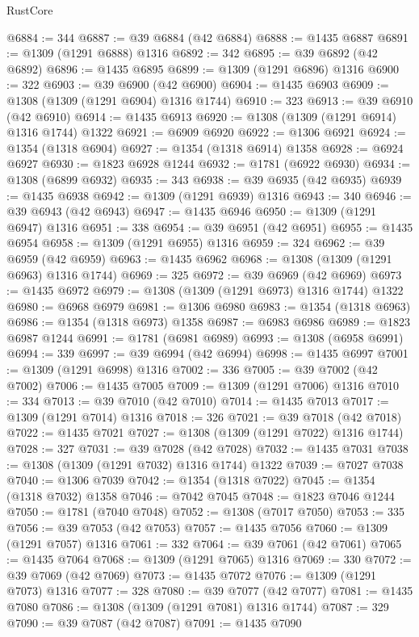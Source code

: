 \begin{lexlean}{RustCore}
\begin{coremodule}
@6884 := 344
@6887 := @39 @6884 (@42 @6884)
@6888 := @1435 @6887
@6891 := @1309 (@1291 @6888) @1316
@6892 := 342
@6895 := @39 @6892 (@42 @6892)
@6896 := @1435 @6895
@6899 := @1309 (@1291 @6896) @1316
@6900 := 322
@6903 := @39 @6900 (@42 @6900)
@6904 := @1435 @6903
@6909 := @1308 (@1309 (@1291 @6904) @1316 @1744)
@6910 := 323
@6913 := @39 @6910 (@42 @6910)
@6914 := @1435 @6913
@6920 := @1308 (@1309 (@1291 @6914) @1316 @1744) @1322
@6921 := @6909 @6920
@6922 := @1306 @6921
@6924 := @1354 (@1318 @6904)
@6927 := @1354 (@1318 @6914) @1358
@6928 := @6924 @6927
@6930 := @1823 @6928 @1244
@6932 := @1781 (@6922 @6930)
@6934 := @1308 (@6899 @6932)
@6935 := 343
@6938 := @39 @6935 (@42 @6935)
@6939 := @1435 @6938
@6942 := @1309 (@1291 @6939) @1316
@6943 := 340
@6946 := @39 @6943 (@42 @6943)
@6947 := @1435 @6946
@6950 := @1309 (@1291 @6947) @1316
@6951 := 338
@6954 := @39 @6951 (@42 @6951)
@6955 := @1435 @6954
@6958 := @1309 (@1291 @6955) @1316
@6959 := 324
@6962 := @39 @6959 (@42 @6959)
@6963 := @1435 @6962
@6968 := @1308 (@1309 (@1291 @6963) @1316 @1744)
@6969 := 325
@6972 := @39 @6969 (@42 @6969)
@6973 := @1435 @6972
@6979 := @1308 (@1309 (@1291 @6973) @1316 @1744) @1322
@6980 := @6968 @6979
@6981 := @1306 @6980
@6983 := @1354 (@1318 @6963)
@6986 := @1354 (@1318 @6973) @1358
@6987 := @6983 @6986
@6989 := @1823 @6987 @1244
@6991 := @1781 (@6981 @6989)
@6993 := @1308 (@6958 @6991)
@6994 := 339
@6997 := @39 @6994 (@42 @6994)
@6998 := @1435 @6997
@7001 := @1309 (@1291 @6998) @1316
@7002 := 336
@7005 := @39 @7002 (@42 @7002)
@7006 := @1435 @7005
@7009 := @1309 (@1291 @7006) @1316
@7010 := 334
@7013 := @39 @7010 (@42 @7010)
@7014 := @1435 @7013
@7017 := @1309 (@1291 @7014) @1316
@7018 := 326
@7021 := @39 @7018 (@42 @7018)
@7022 := @1435 @7021
@7027 := @1308 (@1309 (@1291 @7022) @1316 @1744)
@7028 := 327
@7031 := @39 @7028 (@42 @7028)
@7032 := @1435 @7031
@7038 := @1308 (@1309 (@1291 @7032) @1316 @1744) @1322
@7039 := @7027 @7038
@7040 := @1306 @7039
@7042 := @1354 (@1318 @7022)
@7045 := @1354 (@1318 @7032) @1358
@7046 := @7042 @7045
@7048 := @1823 @7046 @1244
@7050 := @1781 (@7040 @7048)
@7052 := @1308 (@7017 @7050)
@7053 := 335
@7056 := @39 @7053 (@42 @7053)
@7057 := @1435 @7056
@7060 := @1309 (@1291 @7057) @1316
@7061 := 332
@7064 := @39 @7061 (@42 @7061)
@7065 := @1435 @7064
@7068 := @1309 (@1291 @7065) @1316
@7069 := 330
@7072 := @39 @7069 (@42 @7069)
@7073 := @1435 @7072
@7076 := @1309 (@1291 @7073) @1316
@7077 := 328
@7080 := @39 @7077 (@42 @7077)
@7081 := @1435 @7080
@7086 := @1308 (@1309 (@1291 @7081) @1316 @1744)
@7087 := 329
@7090 := @39 @7087 (@42 @7087)
@7091 := @1435 @7090

\end{coremodule}
\end{lexlean}
